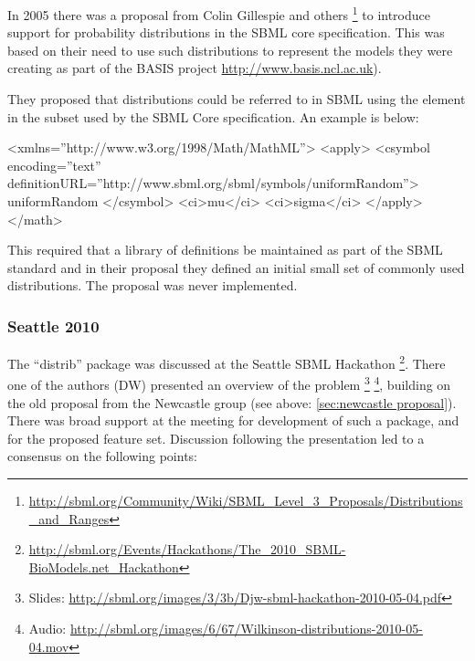 \documentclass[draftspec]{sbmlpkgspec}
\begin{document}
In 2005 there was a proposal from Colin Gillespie and others
\footnote{\url{http://sbml.org/Community/Wiki/SBML_Level_3_Proposals/Distributions_and_Ranges}}
to introduce support for probability distributions in the SBML core specification. This
was based on their need to use such distributions to represent the
models they were creating as part of the BASIS project
\url{http://www.basis.ncl.ac.uk}).

They proposed that distributions could be referred to in SBML using
the  element in the \mathml subset used by
the SBML Core specification. An example is below:

\begin{example}
<xmlns=''http://www.w3.org/1998/Math/MathML''>
  <apply>
    <csymbol encoding=''text''
        definitionURL=''http://www.sbml.org/sbml/symbols/uniformRandom''>
      uniformRandom
    </csymbol>
    <ci>mu</ci>
    <ci>sigma</ci>
  </apply>
</math>
\end{example}

This required that a library of definitions be maintained as part of
the SBML standard and in their proposal they defined an initial small
set of commonly used distributions. The proposal was never
implemented.

\subsubsection{Seattle 2010}

The ``distrib'' package was discussed at the Seattle SBML Hackathon%
\footnote{\url{http://sbml.org/Events/Hackathons/The_2010_SBML-BioModels.net_Hackathon}}. There
one of the authors (DW) presented an overview of the problem%
\footnote{Slides:
 \url{http://sbml.org/images/3/3b/Djw-sbml-hackathon-2010-05-04.pdf}}%
\footnote{Audio:
  \url{http://sbml.org/images/6/67/Wilkinson-distributions-2010-05-04.mov}},
building on the old proposal from the Newcastle group
 (see above: \ref{sec:newcastle proposal}).
There was broad support at the meeting for development of such a
package, and for the proposed feature set. Discussion following the
presentation led to a consensus on the following points:
\end{document}
